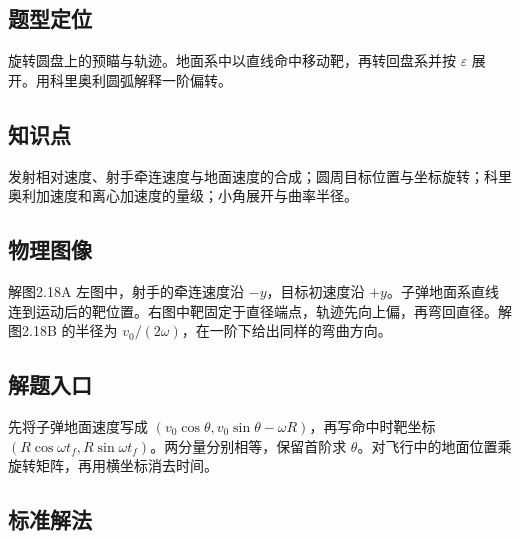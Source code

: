 \documentclass[UTF8,fontset=fandol,a4paper,11pt]{ctexart}
\begin{document}


\subsection*{题型定位}

旋转圆盘上的预瞄与轨迹。地面系中以直线命中移动靶，再转回盘系并按 $\varepsilon$ 展开。用科里奥利圆弧解释一阶偏转。



\subsection*{知识点}

发射相对速度、射手牵连速度与地面速度的合成；圆周目标位置与坐标旋转；科里奥利加速度和离心加速度的量级；小角展开与曲率半径。




\subsection*{物理图像}

解图2.18A 左图中，射手的牵连速度沿 $-y$，目标初速度沿 $+y$。子弹地面系直线连到运动后的靶位置。右图中靶固定于直径端点，轨迹先向上偏，再弯回直径。解图2.18B 的半径为 $v_0/(2\omega)$，在一阶下给出同样的弯曲方向。



\subsection*{解题入口}

先将子弹地面速度写成 $(v_0\cos\theta,v_0\sin\theta-\omega R)$，再写命中时靶坐标 $(R\cos\omega t_f,R\sin\omega t_f)$。两分量分别相等，保留首阶求 $\theta$。对飞行中的地面位置乘旋转矩阵，再用横坐标消去时间。



\subsection*{标准解法}
\end{document}
